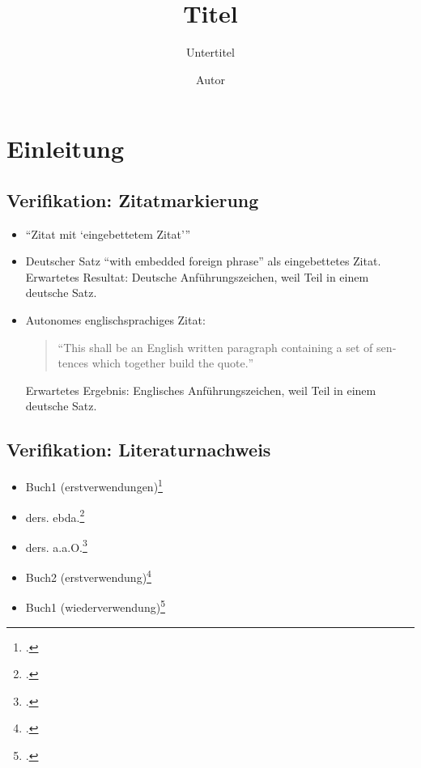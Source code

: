 \documentclass[
  DIV=calc,
  BCOR=5mm,
  11pt,
  headings=small,
  oneside,
  abstract=true,
  toc=bib,
  english,ngerman]{scrbook}
\begin{document}
\nocite{*}

\titlehead{Klassifikation}
\subject{Release }
\title{Titel}
\subtitle{Untertitel}
\author{Autor}


\maketitle

\footnotesize
\tableofcontents

\normalsize
\chapter{Einleitung}

\section{Verifikation: Zitatmarkierung}


\begin{itemize}

  \item \enquote{Zitat mit \enquote{eingebettetem Zitat}}

  \item Deutscher Satz \foreignquote{english}{with embedded foreign phrase} 
  als eingebettetes Zitat. Erwartetes Resultat: Deutsche Anführungszeichen, 
  weil Teil in einem deutsche Satz.
  
  \item Autonomes englischsprachiges Zitat:
  \begin{quote}
    \foreignquote{english}{This shall be an English written paragraph containing
    a set of sentences which together build the quote.}
  \end{quote}
  Erwartetes Ergebnis: Englisches Anführungszeichen, weil Teil in einem deutsche Satz.
\end{itemize}

\section{Verifikation: Literaturnachweis}
\begin{itemize}
  \item Buch1 (erstverwendungen)\footcite[vgl.][15]{KantKdV1974}
  \item ders. ebda.\footcite[vgl.][15]{KantKdV1974}
  \item ders. a.a.O.\footcite[vgl.][23]{KantKdV1974}
  \item Buch2 (erstverwendung)\footcite[vgl.][15]{KantKdU1974}
  \item Buch1 (wiederverwendung)\footcite[vgl.][15]{KantKdV1974}
\end{itemize}
\end{document}
